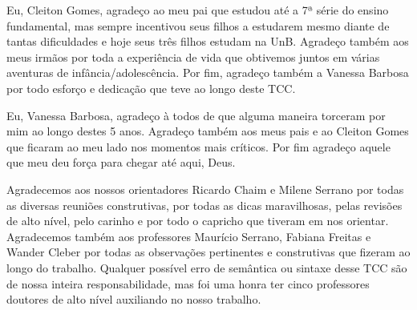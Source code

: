 \begin{agradecimentos}
Eu, Cleiton Gomes, agradeço ao meu pai que estudou até a 7ª série do ensino fundamental, mas sempre incentivou seus filhos a estudarem mesmo diante de tantas dificuldades e hoje seus três filhos estudam na UnB. Agradeço também aos meus irmãos por toda a experiência de vida que obtivemos juntos em várias aventuras de infância/adolescência. Por fim, agradeço também a Vanessa Barbosa por todo esforço e dedicação que teve ao longo deste TCC.

Eu, Vanessa Barbosa, agradeço à todos de que alguma maneira torceram por mim ao longo destes 5 anos. Agradeço também aos meus pais e ao Cleiton Gomes que ficaram ao meu lado nos momentos mais críticos. Por fim agradeço aquele que meu deu força para chegar até aqui, Deus.

Agradecemos aos nossos orientadores Ricardo Chaim e Milene Serrano por todas as diversas reuniões construtivas, por todas as dicas maravilhosas, pelas revisões de alto nível, pelo carinho e por todo o capricho que tiveram em nos orientar. Agradecemos também aos professores Maurício Serrano, Fabiana Freitas e Wander Cleber por todas as observações pertinentes e construtivas que fizeram ao longo do trabalho. Qualquer possível erro de semântica ou sintaxe desse TCC são de nossa inteira responsabilidade, mas foi uma honra ter cinco professores doutores de alto nível auxiliando no nosso trabalho.

\end{agradecimentos}
